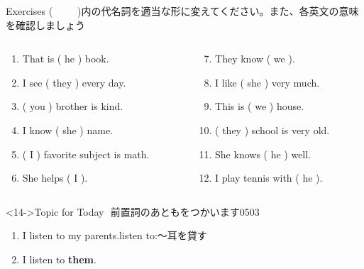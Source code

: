 \documentclass[aspectratio=169,xcolor={dvipsnames,table}]{beamer}
\begin{document}
\begin{frame}[plain]{Exercises}
(~~~~~)内の代名詞を適当な形に変えてください。また、各英文の意味を確認しましょう

\begin{columns}[t]
 \begin{column}{.45\textwidth}
   \begin{enumerate}
  \item That is ( he ) book.\hfill{}
  \item I see ( they ) every day.\hfill{}
  \item ( you ) brother is kind.\hfill{}
  \item I know ( she ) name.\hfill{}
  \item ( I ) favorite subject is math.\hfill{}
  \item She helps ( I ).\hfill{}
 \end{enumerate}
 \end{column}
\begin{column}{.45\textwidth}
  \begin{enumerate}\setcounter{enumi}{6}
  \item They know ( we ).\hfill{}
  \item I like ( she ) very much.\hfill{}
  \item This is ( we ) house.\hfill{}
  \item ( they ) school is very old.\hfill{}
  \item She knows ( he ) well.\hfill{}
  \item I play tennis with ( he ).\hfill{}
 \end{enumerate}
\end{column}
\end{columns}

\begin{block}<14->{Topic for Today}
\dbend\,\,前置詞のあともをつかいます\hfill{\tiny 0503}\,{\scriptsize {}}
 \begin{enumerate}
  \item<14-> I listen to my parents.\hfill{\scriptsize listen to:～耳を貸す}
  \item<15-> I listen to \textbf{them}.
 \end{enumerate}
     \end{block}
\end{frame}
\end{document}
